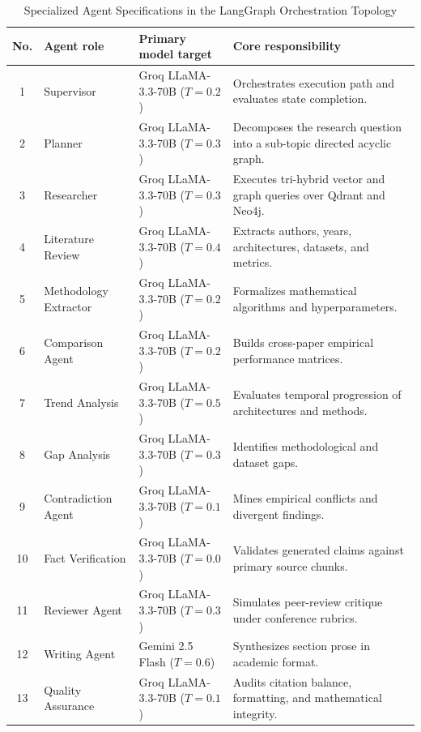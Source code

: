 \documentclass[conference]{IEEEtran}
\begin{document}
\begin{table}[!t]
\caption{Specialized Agent Specifications in the LangGraph Orchestration Topology}
\label{tab:agents}
\centering
\small
\begin{tabularx}{\textwidth}{@{}c l l X@{}}
\toprule
\textbf{No.} & \textbf{Agent role} & \textbf{Primary model target} & \textbf{Core responsibility} \\
\midrule
1 & Supervisor & Groq LLaMA-3.3-70B ($T=0.2$) & Orchestrates execution path and evaluates state completion. \\
2 & Planner & Groq LLaMA-3.3-70B ($T=0.3$) & Decomposes the research question into a sub-topic directed acyclic graph. \\
3 & Researcher & Groq LLaMA-3.3-70B ($T=0.3$) & Executes tri-hybrid vector and graph queries over Qdrant and Neo4j. \\
4 & Literature Review & Groq LLaMA-3.3-70B ($T=0.4$) & Extracts authors, years, architectures, datasets, and metrics. \\
5 & Methodology Extractor & Groq LLaMA-3.3-70B ($T=0.2$) & Formalizes mathematical algorithms and hyperparameters. \\
6 & Comparison Agent & Groq LLaMA-3.3-70B ($T=0.2$) & Builds cross-paper empirical performance matrices. \\
7 & Trend Analysis & Groq LLaMA-3.3-70B ($T=0.5$) & Evaluates temporal progression of architectures and methods. \\
8 & Gap Analysis & Groq LLaMA-3.3-70B ($T=0.3$) & Identifies methodological and dataset gaps. \\
9 & Contradiction Agent & Groq LLaMA-3.3-70B ($T=0.1$) & Mines empirical conflicts and divergent findings. \\
10 & Fact Verification & Groq LLaMA-3.3-70B ($T=0.0$) & Validates generated claims against primary source chunks. \\
11 & Reviewer Agent & Groq LLaMA-3.3-70B ($T=0.3$) & Simulates peer-review critique under conference rubrics. \\
12 & Writing Agent & Gemini 2.5 Flash ($T=0.6$) & Synthesizes section prose in academic format. \\
13 & Quality Assurance & Groq LLaMA-3.3-70B ($T=0.1$) & Audits citation balance, formatting, and mathematical integrity. \\
\bottomrule
\end{tabularx}
\end{table}
\end{document}
